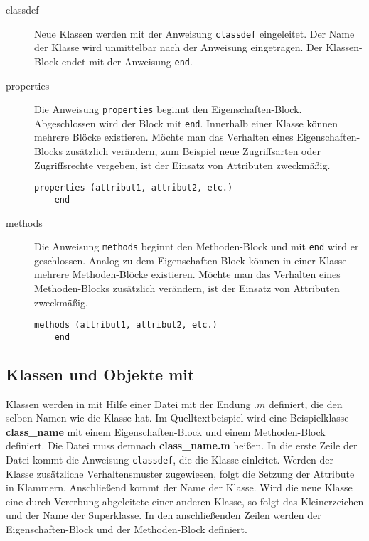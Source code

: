 \begin{description}

	\item[classdef] Neue Klassen werden mit der Anweisung
	\lstinline$classdef$ eingeleitet. Der Name der Klasse wird unmittelbar
	nach der Anweisung eingetragen. Der Klassen-Block endet mit der
	Anweisung \lstinline$end$.
	\item[properties] Die Anweisung \lstinline$properties$ beginnt den
	Eigenschaften-Block. Abgeschlossen wird der Block mit \lstinline$end$.
	Innerhalb einer Klasse k\"onnen mehrere Bl\"ocke existieren. M\"ochte
	man das Verhalten eines Eigenschaften-Blocks zus\"atzlich ver\"andern,
	zum Beispiel neue Zugriffsarten oder Zugriffsrechte vergeben, ist der
	Einsatz von Attributen zweckm\"a\ss ig.
	\begin{lstlisting}[frame=none]
	properties (attribut1, attribut2, etc.)
	end
	\end{lstlisting}
	\item[methods] Die Anweisung \lstinline$methods$ beginnt den
	Methoden-Block und mit \lstinline$end$ wird er geschlossen. Analog zu
	dem Eigenschaften-Block k\"onnen in einer Klasse mehrere
	Methoden-Bl\"ocke existieren. M\"ochte man das Verhalten eines
	Methoden-Blocks zus\"atzlich ver\"andern, ist der Einsatz von Attributen
	zweckm\"a\ss ig.
	\begin{lstlisting}[frame=none]
	methods (attribut1, attribut2, etc.)
	end
	\end{lstlisting}


\end{description}


\subsection*{Klassen und Objekte mit \matlab}

Klassen werden in \matlab mit Hilfe einer Datei mit der Endung $.m$ definiert,
die den selben Namen wie die Klasse hat. Im Quelltextbeispiel
 wird eine Beispielklasse \textbf{class\_name} mit
einem Eigenschaften-Block und einem Methoden-Block definiert. Die Datei muss
demnach \textbf{class\_name.m} hei\ss en. In die erste Zeile der Datei kommt die
Anweisung \lstinline$classdef$, die die Klasse einleitet. Werden der Klasse
zus\"atzliche Verhaltensmuster zugewiesen, folgt die Setzung der Attribute in
Klammern. Anschlie\ss end kommt der Name der Klasse. Wird die neue Klasse eine
durch Vererbung abgeleitete einer anderen Klasse, so folgt das Kleinerzeichen
und der Name der Superklasse. In den anschlie\ss enden Zeilen werden der
Eigenschaften-Block und der Methoden-Block definiert.

